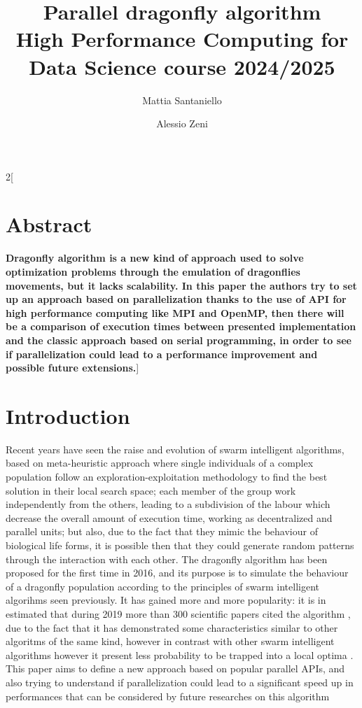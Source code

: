 \documentclass[10pt]{article}
\title{\textbf{Parallel dragonfly algorithm} %
  \\[2ex] \large High Performance Computing for Data Science course 2024/2025}
\author[1]{Mattia Santaniello}
\author[2]{Alessio Zeni}
\affil{University of Trento}
\begin{document}
\maketitle

\begin{multicols}{2}[\fontsize{9}{9}\section*{Abstract} \textbf{Dragonfly algorithm is a new kind of approach used to solve optimization problems through the emulation of dragonflies movements, but it lacks scalability. In this paper the authors try to set up an approach based on parallelization thanks to the use of API for high performance computing like MPI and OpenMP, then there will be a comparison of execution times between presented implementation and the classic approach based on serial programming, in order to see if parallelization could lead to a performance improvement and possible future extensions.}\newline]

\section{Introduction}

Recent years have seen the raise and evolution of swarm intelligent algorithms, based on meta-heuristic approach where single individuals of a complex population follow an exploration-exploitation methodology to find the best solution in their local search space; each member of the group work independently from the others, leading to a subdivision of the labour which decrease the overall amount of execution time, working as decentralized and parallel units; but also, due to the fact that they mimic the behaviour of biological life forms, it is possible then that they could generate random patterns through the interaction with each other.  The dragonfly algorithm has been proposed for the first time in 2016, and its purpose is to simulate the behaviour of a dragonfly population according to the principles of swarm intelligent algorihms seen previously. It has gained more and more popularity: it is in estimated that during 2019 more than 300 scientific papers cited the algorithm \cite{DASurvey}, due to the fact that it has demonstrated some characteristics similar to other algoritms of the same kind, however in contrast with other swarm intelligent algorithms however it present less probability to be trapped into a local optima \cite{DAReview}. This paper aims to define a new approach based on popular parallel APIs, and also trying to understand if parallelization could lead to a significant speed up in performances that can be considered by future researches on this algorithm 


\end{multicols}
\end{document}
